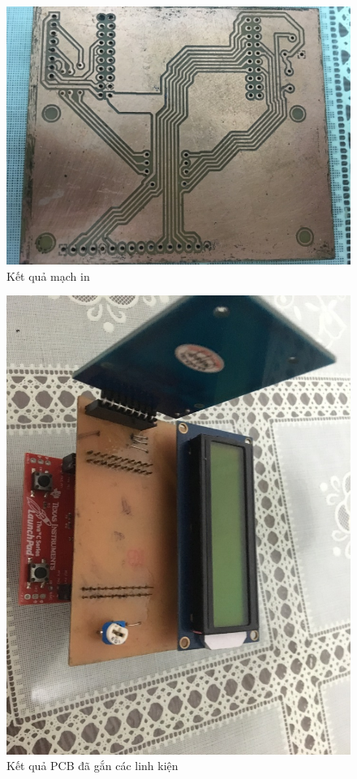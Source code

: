 \begin{figure}[ht]
\centering
\includegraphics[scale=0.3]{images/board_output.jpg}
\caption{Kết quả mạch in}
\label{fig:pcb_out}
\end{figure}

\begin{figure}[ht]
\centering
\includegraphics[scale=0.2]{images/board_finish.jpg}
\caption{Kết quả PCB đã gắn các linh kiện}
\label{fig:system}
\end{figure}

